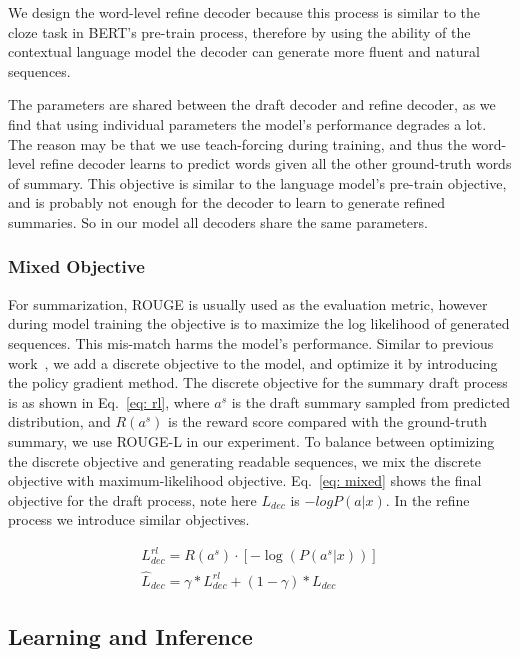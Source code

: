 \documentclass{article}
\begin{document}
We design the word-level refine decoder because this process is similar to the cloze task in BERT's pre-train process, therefore by using the ability of the contextual language model the decoder can generate more fluent and natural sequences.

The parameters are shared between the draft decoder and refine decoder, as we find that using individual parameters the model's performance degrades a lot. The reason may be that we use teach-forcing during training, and thus the word-level refine decoder learns to predict words given all the other ground-truth words of summary. This objective is similar to the language model's pre-train objective, and is probably not enough for the decoder to learn to generate refined summaries. So in our model all decoders share the same parameters.

\subsubsection{Mixed Objective}

For summarization, ROUGE is usually used as the evaluation metric, however during model training the objective is to maximize the log likelihood of generated sequences. This mis-match harms the model's performance. Similar to previous work~\cite{kryscinski2018improving}, we add a discrete objective to the model, and optimize it by introducing the policy gradient method. The discrete objective for the summary draft process is as shown in Eq.~\eqref{eq: rl}, where $a^s$ is the draft summary sampled from predicted distribution, and $R(a^s)$ is the reward score compared with the ground-truth summary, we use ROUGE-L in our experiment. To balance between optimizing the discrete objective and generating readable sequences, we mix the discrete objective with maximum-likelihood objective. Eq.~\eqref{eq: mixed} shows the final objective for the draft process, note here $L_{dec}$ is $-logP(a|x)$. In the refine process we introduce similar objectives. 

\begin{eqnarray}
    L^{rl}_{dec} = R(a^s)\cdot  [-\log (P(a^s|x))] \label{eq: rl} \\
    \hat L_{dec} = \gamma * L^{rl}_{dec} + (1 - \gamma) * L_{dec} \label{eq: mixed}
\end{eqnarray}

\subsection{Learning and Inference}
\end{document}
